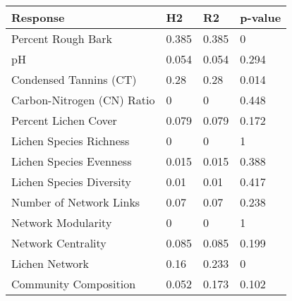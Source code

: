 \begin{table}[ht]
\centering
\begin{tabular}{llll}
  \hline
Response & H2 & R2 & p-value \\ 
  \hline
Percent Rough Bark & 0.385 & 0.385 & 0 \\ 
  pH & 0.054 & 0.054 & 0.294 \\ 
  Condensed Tannins (CT) & 0.28 & 0.28 & 0.014 \\ 
  Carbon-Nitrogen (CN) Ratio & 0 & 0 & 0.448 \\ 
  Percent Lichen Cover & 0.079 & 0.079 & 0.172 \\ 
  Lichen Species Richness & 0 & 0 & 1 \\ 
  Lichen Species Evenness & 0.015 & 0.015 & 0.388 \\ 
  Lichen Species Diversity & 0.01 & 0.01 & 0.417 \\ 
  Number of Network Links & 0.07 & 0.07 & 0.238 \\ 
  Network Modularity & 0 & 0 & 1 \\ 
  Network Centrality & 0.085 & 0.085 & 0.199 \\ 
  Lichen Network & 0.16 & 0.233 & 0 \\ 
  Community Composition & 0.052 & 0.173 & 0.102 \\ 
   \hline
\end{tabular}
\end{table}
